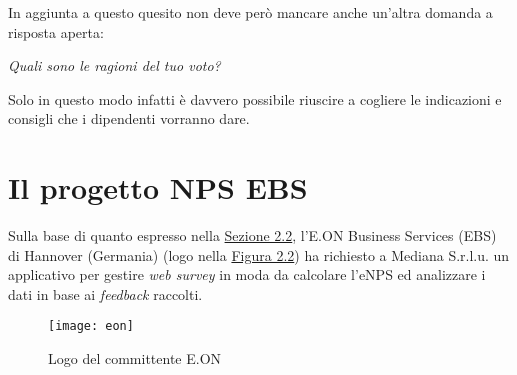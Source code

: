 In aggiunta a questo quesito non deve però mancare anche un'altra domanda a risposta aperta:
\begin{center}
\emph{Quali sono le ragioni del tuo voto?}
\end{center}
Solo in questo modo infatti è davvero possibile riuscire a cogliere le indicazioni e consigli che i dipendenti vorranno dare. 

\section{Il progetto NPS EBS}
Sulla base di quanto espresso nella \hyperref[concetto eNPS]{Sezione 2.2}, l'E.ON Business Services (EBS) di Hannover (Germania) (logo nella \hyperref[EON]{Figura 2.2}) ha richiesto a Mediana S.r.l.u. un applicativo per gestire \textit{web survey} in moda da calcolare l'eNPS ed analizzare i dati in base ai \textit{feedback} raccolti.

\begin{figure}[ht]
\begin{center}
\texttt{[image: eon]}
\caption{Logo del committente E.ON}
\label{EON}
\end{center}
\end{figure}

